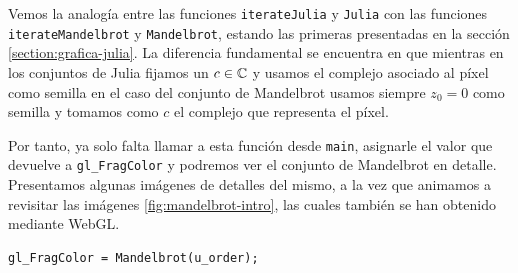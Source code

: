 Vemos la analogía entre las funciones \verb|iterateJulia| y \verb|Julia| con las funciones \verb|iterateMandelbrot| y \verb|Mandelbrot|, estando las primeras presentadas en la sección \ref{section:grafica-julia}. La diferencia fundamental se encuentra en que mientras en los conjuntos de Julia fijamos un $c\in\mathbb{C}$ y usamos el complejo asociado al píxel como semilla en el caso del conjunto de Mandelbrot usamos siempre $z_0=0$ como semilla y tomamos como $c$ el complejo que representa el píxel.

Por tanto, ya solo falta llamar a esta función desde \verb|main|, asignarle el valor que devuelve a \verb|gl_FragColor| y podremos ver el conjunto de Mandelbrot en detalle. Presentamos algunas imágenes de detalles del mismo, a la vez que animamos a revisitar las imágenes \ref{fig:mandelbrot-intro}, las cuales también se han obtenido mediante WebGL.

\begin{lstlisting}
gl_FragColor = Mandelbrot(u_order);
\end{lstlisting}

